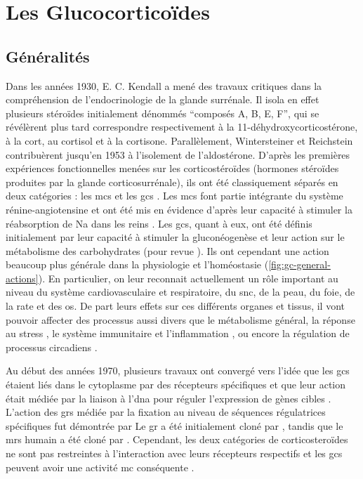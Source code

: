 \documentclass[../main.tex]{subfiles}
\begin{document}
\chapter{Les Glucocorticoïdes}


\section{Généralités}
Dans les années 1930, E. C. Kendall a mené des travaux critiques dans la compréhension de l'endocrinologie de la glande surrénale.
Il isola en effet plusieurs stéroïdes initialement dénommés ``composés A, B, E, F'', qui se révélèrent plus tard correspondre respectivement à la 11-déhydroxycorticostérone, à la \gls{cort}, au cortisol et à la cortisone.
Parallèlement, Wintersteiner et Reichstein contribuèrent jusqu'en 1953 à l'isolement de l'aldostérone.
D'après les premières expériences fonctionnelles menées sur les corticostéroïdes (hormones stéroïdes produites par la glande corticosurrénale), ils ont été classiquement séparés en deux catégories : les \glspl{mc} et les \glspl{gc} \citep{Simpson1952,Simpson1954}.
Les \glspl{mc} font partie intégrante du système rénine-angiotensine et ont été mis en évidence d'après leur capacité à stimuler la réabsorption de \gls{Na} dans les reins \citep{Gomez-Sanchez1996}.
Les \glspl{gc}, quant à eux, ont été définis initialement par leur capacité à stimuler la gluconéogenèse et leur action sur le métabolisme des carbohydrates (pour revue \citealp{McMahon1988}).
Ils ont cependant une action beaucoup plus générale dans la physiologie et l'homéostasie (\autoref{fig:gc-general-actions}).
En particulier, on leur reconnait actuellement un rôle important au niveau du système cardiovasculaire et respiratoire, du \gls{snc}, de la peau, du foie, de la rate et des os.
De part leurs effets sur ces différents organes et tissus, il vont pouvoir affecter des processus aussi divers que le métabolisme général, la réponse au stress \citep{Sapolsky2000}, le système immunitaire et l'inflammation \citep{Busillo2013}, ou encore la régulation de processus circadiens \citep{Dickmeis2009}.



Au début des années 1970, plusieurs travaux ont convergé vers l'idée que les \glspl{gc} étaient liés dans le cytoplasme par des récepteurs spécifiques \citep{Baxter1971,Rousseau1972} et que leur action était médiée par la liaison à l'\gls{dna} pour réguler l'expression de gènes cibles \citep{Baxter1972,Payvar1981}.
L'action des \glspl{gr} médiée par la fixation au niveau de séquences régulatrices spécifiques fut démontrée par \citet{Chandler1983,Karin1984,Slater1985}
Le \gls{gr} a été initialement cloné par \citet{Weinberger1985}, tandis que le \glspl{mr} humain a été cloné par \citet{Arriza1987}.
Cependant, les deux catégories de corticosteroïdes ne sont pas restreintes à l'interaction avec leurs récepteurs respectifs et les \glspl{gc} peuvent avoir une activité \gls{mc} conséquente \citep{Funder1973,Reul1990}.
\end{document}
